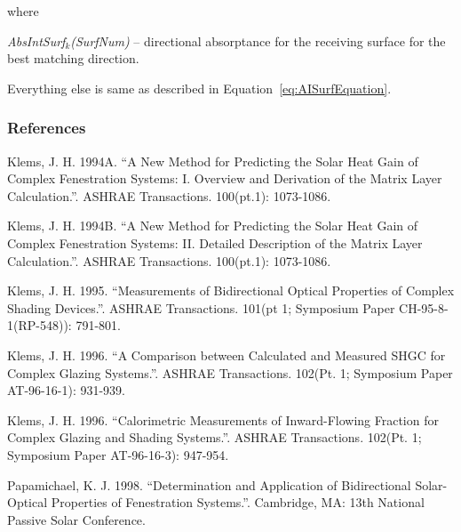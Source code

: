 where

\emph{AbsIntSurf\(_{k}\)(SurfNum)} -- directional absorptance for the receiving surface for the best matching direction.

Everything else is same as described in Equation~\ref{eq:AISurfEquation}.

\subsubsection{References}\label{references-1-018}

Klems, J. H. 1994A. ``A New Method for Predicting the Solar Heat Gain of Complex Fenestration Systems: I. Overview and Derivation of the Matrix Layer Calculation.''. ASHRAE Transactions. 100(pt.1): 1073-1086.

Klems, J. H. 1994B. ``A New Method for Predicting the Solar Heat Gain of Complex Fenestration Systems: II. Detailed Description of the Matrix Layer Calculation.''. ASHRAE Transactions. 100(pt.1): 1073-1086.

Klems, J. H. 1995. ``Measurements of Bidirectional Optical Properties of Complex Shading Devices.''. ASHRAE Transactions. 101(pt 1; Symposium Paper CH-95-8-1(RP-548)): 791-801.

Klems, J. H. 1996. ``A Comparison between Calculated and Measured SHGC for Complex Glazing Systems.''. ASHRAE Transactions. 102(Pt. 1; Symposium Paper AT-96-16-1): 931-939.

Klems, J. H. 1996. ``Calorimetric Measurements of Inward-Flowing Fraction for Complex Glazing and Shading Systems.''. ASHRAE Transactions. 102(Pt. 1; Symposium Paper AT-96-16-3): 947-954.

Papamichael, K. J. 1998. ``Determination and Application of Bidirectional Solar-Optical Properties of Fenestration Systems.''. Cambridge, MA: 13th National Passive Solar Conference.
